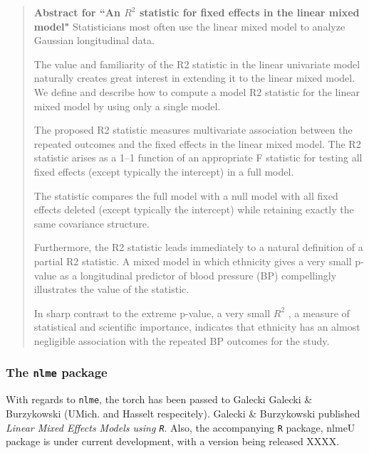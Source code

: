 \documentclass[12pt, a4paper]{article}
\begin{document}
\begin{framed}
	
	\begin{quote}
		\textbf{Abstract for ``An $R^2$ statistic for fixed effects in the linear mixed model"}
		Statisticians most often use the linear mixed model to analyze Gaussian longitudinal data. 
		
		The value and familiarity of the R2 statistic in the linear univariate model naturally creates great interest in extending it to the linear mixed model. We define and describe how to compute a model R2 statistic for the linear mixed model by using only a single model. 
		
		The proposed R2 statistic measures multivariate association between the repeated outcomes and the fixed effects in the linear mixed model. The R2 statistic arises as a 1–1 function of an appropriate F statistic for testing all fixed effects (except typically the intercept) in a full model. 
		
		The statistic compares the full model with a null model with all fixed effects deleted (except typically the intercept) while retaining exactly the same covariance structure. 
		
		Furthermore, the R2 statistic leads immediately to a natural definition of a partial R2 statistic. A mixed model in which ethnicity gives a very small p-value as a longitudinal predictor of blood pressure (BP) compellingly illustrates the value of the statistic. 
		
		In sharp contrast to the extreme p-value, a very small $R^2$ , a measure of statistical and scientific importance, indicates that ethnicity has an almost negligible association with the repeated BP outcomes for the study.
	\end{quote}
\end{framed}

\subsubsection*{The \texttt{nlme} package}

With regards to \texttt{nlme}, the torch has been passed to Galecki Galecki \& Burzykowski (UMich. and Hasselt respecitely).  Galecki \& Burzykowski published \textit{Linear Mixed Effects Models using \texttt{R}}. 
Also, the accompanying \texttt{R} package, nlmeU package is under current development, with a version being released XXXX.


\end{document}
